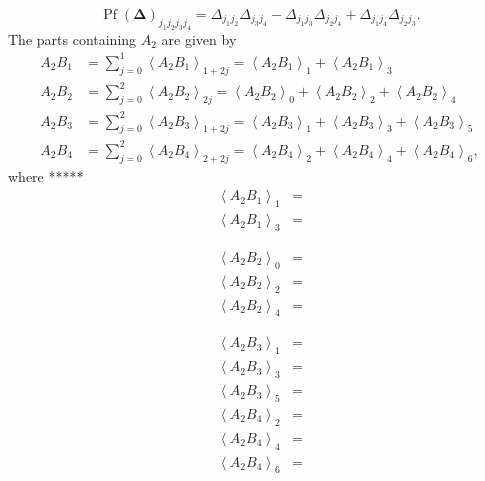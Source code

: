 \documentclass[aps,preprint]{revtex4}%
\begin{document}
\begin{equation}
\operatorname*{Pf}\left(  \mathbf{\Delta}\right)  _{j_{1}j_{2}j_{3}j_{4}%
}=\Delta_{j_{1}j_{2}}\Delta_{j_{3}j_{4}}-\Delta_{j_{1}j_{3}}\Delta_{j_{2}%
j_{4}}+\Delta_{j_{1}j_{4}}\Delta_{j_{2}j_{3}}.
\end{equation}
The parts containing $A_{2}$ are given by
\begin{align}
A_{2}B_{1}  &  =\sum_{j=0}^{1}\left\langle A_{2}B_{1}\right\rangle
_{1+2j}=\left\langle A_{2}B_{1}\right\rangle _{1}+\left\langle A_{2}%
B_{1}\right\rangle _{3}\\
A_{2}B_{2}  &  =\sum_{j=0}^{2}\left\langle A_{2}B_{2}\right\rangle
_{2j}=\left\langle A_{2}B_{2}\right\rangle _{0}+\left\langle A_{2}%
B_{2}\right\rangle _{2}+\left\langle A_{2}B_{2}\right\rangle _{4}\\
A_{2}B_{3}  &  =\sum_{j=0}^{2}\left\langle A_{2}B_{3}\right\rangle
_{1+2j}=\left\langle A_{2}B_{3}\right\rangle _{1}+\left\langle A_{2}%
B_{3}\right\rangle _{3}+\left\langle A_{2}B_{3}\right\rangle _{5}\\
A_{2}B_{4}  &  =\sum_{j=0}^{2}\left\langle A_{2}B_{4}\right\rangle
_{2+2j}=\left\langle A_{2}B_{4}\right\rangle _{2}+\left\langle A_{2}%
B_{4}\right\rangle _{4}+\left\langle A_{2}B_{4}\right\rangle _{6},
\end{align}
where *****
\begin{align}
\left\langle A_{2}B_{1}\right\rangle _{1}  &  =\\
\left\langle A_{2}B_{1}\right\rangle _{3}  &  =
\end{align}
%

\begin{align}
\left\langle A_{2}B_{2}\right\rangle _{0}  &  =\\
\left\langle A_{2}B_{2}\right\rangle _{2}  &  =\\
\left\langle A_{2}B_{2}\right\rangle _{4}  &  =
\end{align}
%

\begin{align}
\left\langle A_{2}B_{3}\right\rangle _{1}  &  =\\
\left\langle A_{2}B_{3}\right\rangle _{3}  &  =\\
\left\langle A_{2}B_{3}\right\rangle _{5}  &  =
\end{align}%
\begin{align}
\left\langle A_{2}B_{4}\right\rangle _{2}  &  =\\
\left\langle A_{2}B_{4}\right\rangle _{4}  &  =\\
\left\langle A_{2}B_{4}\right\rangle _{6}  &  =
\end{align}
\end{document}
